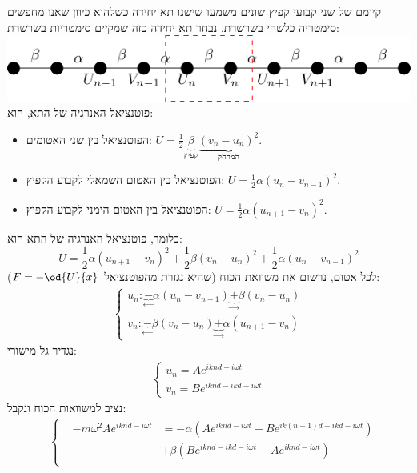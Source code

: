\documentclass{article}
\begin{document}
\begin{Answer}
קיומם של שני קבועי קפיץ שונים משמעו שישנו תא יחידה כשלהוא כיוון שאנו מחפשים סימטריה כלשהי בשרשרת. נבחר תא יחידה כזה שמקיים סימטריות בשרשרת:\\ 
\includegraphics[width=\textwidth]{image/Q2image.pdf}
פוטנציאל האנרגיה של התא, הוא:
\begin{itemize}
    \item הפוטנציאל בין שני האטומים: $U=\frac{1}{2}\underbrace{\beta}_{\text{קפיץ}}\underbrace{(v_{n}-u_{n})^{2}}_{\text{המרחק}}$.
    \item הפוטנציאל בין האטום השמאלי לקבוע הקפיץ: $U=\frac{1}{2}\alpha(u_{n}-v_{n-1})^{2}$.
    \item הפוטנציאל בין האטום הימני לקבוע הקפיץ: $U=\frac{1}{2}\alpha(u_{n+1}-v_{n})^{2}$.
\end{itemize}
כלומר, פוטנציאל האנרגיה של התא הוא:
\begin{equation*}
    U=\frac{1}{2}\alpha(u_{n+1}-v_{n})^{2}+\frac{1}{2}\beta(v_{n}-u_{n})^{2}+\frac{1}{2}\alpha(u_{n}-v_{n-1})^{2}
\end{equation*}
לכל אטום, נרשום את משוואת הכוח (שהיא נגזרת מהפוטנציאל $F=-\od{U}{x}$):
\begin{align*}
    \begin{cases}
        u_{n}:\underbrace{-}_{\leftarrow}\alpha\left( u_{n}-v_{n-1} \right)\underbrace{+}_{\rightarrow}\beta\left( v_{n}-u_{n} \right)\\
        v_{n}:\underbrace{-}_{\leftarrow}\beta\left( v_{n}-u_{n} \right)\underbrace{+}_{\rightarrow}\alpha\left( u_{n+1}-v_{n} \right)
    \end{cases}
\end{align*}
נגדיר גל מישורי:
\begin{align*}
    \begin{cases}
        u_{n}=Ae^{iknd - i\omega t}\\
        v_{n}=Be^{iknd -ikd - i\omega t}
    \end{cases}
\end{align*}
נציב למשוואות הכוח ונקבל:
\begin{align*}
    &\left\{\begin{aligned}
        &-m\omega^{2}Ae^{iknd - i\omega t}&=-\alpha\left( Ae^{iknd - i\omega t}-Be^{ik(n-1)d -ikd - i\omega t} \right)\\&&+\beta\left( Be^{iknd -ikd - i\omega t}-Ae^{iknd - i\omega t} \right)\\

\end{aligned}
\end{align*}
\end{Answer}
\end{document}
